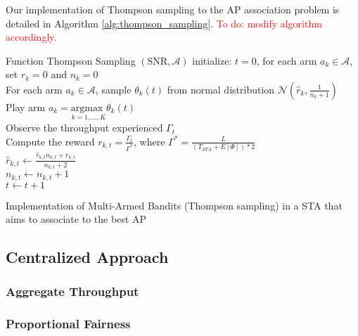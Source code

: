 \documentclass{ article}
\begin{document}
			Our implementation of Thompson sampling to the AP association problem is detailed in Algorithm \ref{alg:thompson_sampling}.
			\textcolor{red}{To do: modify algorithm accordingly.}	
			\begin{algorithm}[h!]
				Function Thompson Sampling $(\text{SNR},\mathcal{A})$\;
				initialize: $t=0$,  for each arm $a_k \in \mathcal{A}$, set $\hat{r}_{k} = 0$ and $n_k = 0$ \\
				{
					For each arm $a_k \in \mathcal{A}$, sample $\theta_k(t)$ from normal distribution $\mathcal{N}(\hat{r}_{k}, \frac{1}{n_k + 1})$ \\
					Play arm $a_{k} = \underset{k=1,...,K}{\text{argmax }} \theta_k(t) $ \\
					Observe the throughput experienced $\Gamma_t$\\			
					Compute the reward $r_{k,t} = \frac{\Gamma_t}{\Gamma^*}$, where $\Gamma^* = \frac{L}{(T_{STA}+E[\Phi])*2}$ \\
					$ \hat{r}_{k,t} \leftarrow \frac{\hat{r}_{k,t}  n_{k,t} + r_{k,t}}{n_{k,t} + 2}$\\
					$n_{k,t} \leftarrow n_{k,t} + 1$\\
					$t \leftarrow t + 1$
				}
				\caption{Implementation of Multi-Armed Bandits (Thompson sampling) in a STA that aims to associate to the best AP}
				\label{alg:thompson_sampling}
			\end{algorithm}	
			
	\subsection{Centralized Approach}
	\label{section:centralized}
	
		\subsubsection{Aggregate Throughput}
		\label{section:aggregate_throughput}
		
		\subsubsection{Proportional Fairness}
		\label{section:prop_fairness}
		
\end{document}
